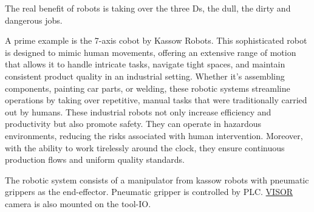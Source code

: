 The real benefit of robots is taking over the three Ds, the dull, the dirty and dangerous jobs. \cite{jordan2016robots}

A prime example is the 7-axis cobot by Kassow Robots. This sophisticated robot is designed to mimic human movements, offering an extensive range of motion that allows it to handle intricate tasks, navigate tight spaces, and maintain consistent product quality in an industrial setting.
Whether it's assembling components, painting car parts, or welding, these robotic systems streamline operations by taking over repetitive, manual tasks that were traditionally carried out by humans.
These industrial robots not only increase efficiency and productivity but also promote safety.
They can operate in hazardous environments, reducing the risks associated with human intervention. 
Moreover, with the ability to work tirelessly around the clock, they ensure continuous production flows and uniform quality standards.
\cite{kassowrobotsblog}

The robotic system consists of a manipulator from kassow robots with pneumatic grippers as the end-effector.
Pneumatic gripper is controlled by PLC. \hyperref[acro:VISOR]{VISOR\textsuperscript{\textregistered}} camera is also mounted on the tool-IO.
